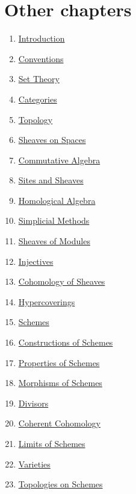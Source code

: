 \section{Other chapters}

\begin{multicols}{2}
\begin{enumerate}
\item \hyperref[introduction-section-phantom]{Introduction}
\item \hyperref[conventions-section-phantom]{Conventions}
\item \hyperref[sets-section-phantom]{Set Theory}
\item \hyperref[categories-section-phantom]{Categories}
\item \hyperref[topology-section-phantom]{Topology}
\item \hyperref[sheaves-section-phantom]{Sheaves on Spaces}
\item \hyperref[algebra-section-phantom]{Commutative Algebra}
\item \hyperref[sites-section-phantom]{Sites and Sheaves}
\item \hyperref[homology-section-phantom]{Homological Algebra}
\item \hyperref[simplicial-section-phantom]{Simplicial Methods}
\item \hyperref[modules-section-phantom]{Sheaves of Modules}
\item \hyperref[injectives-section-phantom]{Injectives}
\item \hyperref[cohomology-section-phantom]{Cohomology of Sheaves}
\item \hyperref[hypercovering-section-phantom]{Hypercoverings}
\item \hyperref[schemes-section-phantom]{Schemes}
\item \hyperref[constructions-section-phantom]{Constructions of Schemes}
\item \hyperref[properties-section-phantom]{Properties of Schemes}
\item \hyperref[morphisms-section-phantom]{Morphisms of Schemes}
\item \hyperref[divisors-section-phantom]{Divisors}
\item \hyperref[coherent-section-phantom]{Coherent Cohomology}
\item \hyperref[limits-section-phantom]{Limits of Schemes}
\item \hyperref[varieties-section-phantom]{Varieties}
\item \hyperref[topologies-section-phantom]{Topologies on Schemes}

\end{enumerate}
\end{multicols}
